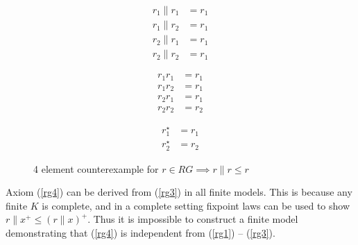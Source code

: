 \documentclass{llncs}
\begin{document}
\begin{figure}[H]
\centering
\begin{minipage}{0.24\textwidth}
\end{minipage}
\begin{minipage}{0.24\textwidth}
\begin{align*}
r_1 \| r_1 &= r_1\\
r_1 \| r_2 &= r_1\\
r_2 \| r_1 &= r_1\\
r_2 \| r_2 &= r_1
\end{align*}
\end{minipage}
\begin{minipage}{0.24\textwidth}
\begin{align*}
r_1r_1 &= r_1\\
r_1r_2 &= r_1\\
r_2r_1 &= r_1\\
r_2r_2 &= r_2
\end{align*}
\end{minipage}
\begin{minipage}{0.24\textwidth}
\begin{align*}
r_1^\star &= r_1\\
r_2^\star &= r_2
\end{align*}
\end{minipage}
\caption{4 element counterexample for $r \in RG \implies r\|r \le r$}
\label{fig:rg1}
\end{figure}

Axiom (\ref{rg4}) can be derived from (\ref{rg3}) in all finite
models. This is because any finite $K$ is complete, and in a complete
setting fixpoint laws can be used to show $r\|x^+ \le (r\|x)^+$. Thus
it is impossible to construct a finite model demonstrating that
(\ref{rg4}) is independent from (\ref{rg1}) -- (\ref{rg3}).
\end{document}
